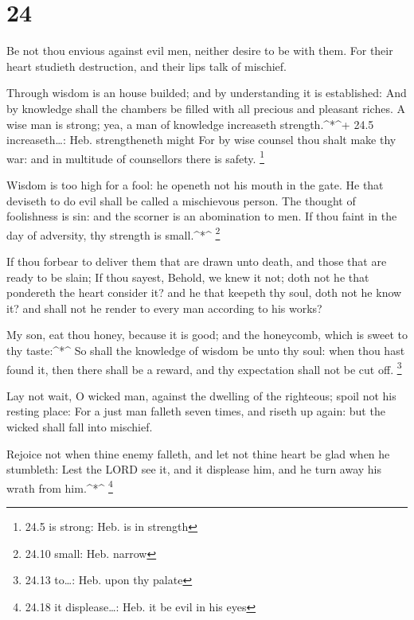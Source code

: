\hypertarget{section-23}{%
\section{24}\label{section-23}}

 Be not thou envious against evil men, neither desire to be
with them.  For their heart studieth destruction, and their
lips talk of mischief.

 Through wisdom is an house builded; and by understanding it
is established:  And by knowledge shall the chambers be
filled with all precious and pleasant riches.  A wise man is
strong; yea, a man of knowledge increaseth strength.\^{}*\^{}+ 24.5
increaseth\ldots: Heb. strengtheneth might  For by wise
counsel thou shalt make thy war: and in multitude of counsellors there
is safety. \footnote{24.5 is strong: Heb. is in strength}

 Wisdom is too high for a fool: he openeth not his mouth in
the gate.  He that deviseth to do evil shall be called a
mischievous person.  The thought of foolishness is sin: and
the scorner is an abomination to men.  If thou faint in the
day of adversity, thy strength is small.\^{}*\^{} \footnote{24.10 small:
  Heb. narrow}

 If thou forbear to deliver them that are drawn unto death,
and those that are ready to be slain;  If thou sayest,
Behold, we knew it not; doth not he that pondereth the heart consider
it? and he that keepeth thy soul, doth not he know it? and shall not he
render to every man according to his works?

 My son, eat thou honey, because it is good; and the
honeycomb, which is sweet to thy taste:\^{}*\^{}  So shall
the knowledge of wisdom be unto thy soul: when thou hast found it, then
there shall be a reward, and thy expectation shall not be cut off.
\footnote{24.13 to\ldots: Heb. upon thy palate}

 Lay not wait, O wicked man, against the dwelling of the
righteous; spoil not his resting place:  For a just man
falleth seven times, and riseth up again: but the wicked shall fall into
mischief.

 Rejoice not when thine enemy falleth, and let not thine
heart be glad when he stumbleth:  Lest the LORD see it, and
it displease him, and he turn away his wrath from him.\^{}*\^{}
\footnote{24.18 it displease\ldots: Heb. it be evil in his eyes}

